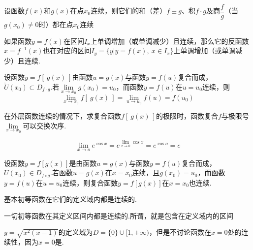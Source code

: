 \documentclass[lang=cn,10pt]{elegantbook}
\begin{document}
\begin{theorem}
	设函数\( f(x) \)和\( g(x) \)在点\( x_{0} \)连续，则它们的和（差）\( f \pm g \)、积\( f \cdot g \)及商\( \dfrac{f}{g} \)（当\( g(x_{0}) \neq 0 \)时）都在点\( x_{0} \)连续
\end{theorem}

\begin{theorem}
	如果函数\( y = f(x) \)在区间\( I_{x} \)上单调增加（或单调减少）且连续，那么它的反函数\( x = f^{-1}(x) \)也在对应的区间\( I_{y} = \{y | y = f(x),\ x\in I_{x}\} \)上单调增加（或单调减少）且连续.
\end{theorem}

\begin{theorem}
	设函数\( y =f[\ g(x)\ ] \)由函数\( u = g(x) \)与函数\( y = f(u) \)复合而成，\( \mathring{U}(x_{0}) \subset D_{f \cdot g} \).若\( \lim\limits_{x \to x_{0}}g(x_{0}) = u_{0} \)，而函数\( y = f(u) \)在\( u = u_{0} \)连续，则
	\[ \lim\limits_{x \to x_{0}}f[\ g(x)\ ] = \lim\limits_{u \to u_{0}}f(u) = f(u_{0}) \]
\end{theorem}

\begin{note}
	在外层函数连续的情况下，求复合函数\( f[\ g(x)\ ] \)的极限时，函数复合\( f \)与极限号\( \lim\limits_{x \to x_{0}} \)可以交换次序.
	\begin{example}
		\[ \lim\limits_{x \to o}e^{\cos x} = e^{\lim\limits_{x \to 0}\cos x} = e^{\cos o} = e \]
	\end{example}
\end{note}

\begin{theorem}
	设函数\( y = f[g(x)] \)是由函数\( u = g(x) \)与函数\( y = f(u) \)复合而成，\( U(x_{0}) \in D_{f \circ g} \).若函数\( u = g(x) \)在\( x = x_{0} \)连续，且\( g(x_{0}) = u_{0} \)，而函数\( y = f(u) \)在\( u = u_{0} \)连续，则复合函数\( y = f[g(x)] \)在\( x = x_{0} \)也连续.
\end{theorem}

\begin{conclusion}
	基本初等函数在它们的定义域内都是连续的.
\end{conclusion}

\begin{conclusion}
	一切初等函数在其定义区间内都是连续的.所谓，就是包含在定义域内的区间
\end{conclusion}

\begin{example}
	\( y = \sqrt{x^{2}(x - 1)} \)的定义域为\( D = \{0\}\cup [1, +\infty) \)，但是不讨论函数在\(  x = 0 \)处的连续性，因为\( x = 0 \)是.
\end{example}
\end{document}
